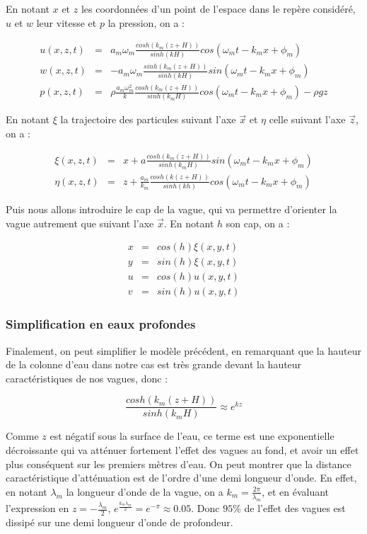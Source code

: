 				En notant $x$ et $z$ les coordonnées d'un point de l'espace dans le repère considéré, $u$ et $w$ leur vitesse et $p$ la pression, on a :

				\begin{eqnarray}
					u(x, z, t) & = & a_m \omega_m \frac{cosh(k_m(z+H))}{sinh(kH)} cos(\omega_m t -k_mx + \phi_m) \\
					w(x, z, t) & = & -a_m \omega_m \frac{sinh(k_m(z+H))}{sinh(kH)} sin(\omega_m t -k_mx + \phi_m) \\
					p(x, z, t) & = & \rho\frac{a_m\omega_m^2}{k} \frac{cosh(k_m(z+H))}{sinh(k_mH)} cos(\omega_m t -k_mx + \phi_m) - \rho g z
				\end{eqnarray}

				En notant $\xi$ la trajectoire des particules suivant l'axe $\overrightarrow{x}$ et $\eta$ celle suivant l'axe $\overrightarrow{z}$, on a :

				\begin{eqnarray}
					\xi(x, z, t) & = & x + a \frac{cosh(k_m(z+H))}{sinh(k_mH)} sin(\omega_m t -k_mx + \phi_m) \\
					\eta(x, z, t) & = & z + \frac{a_m}{k_m} \frac{cosh(k(z+H))}{sinh(kh)} cos(\omega_m t -k_mx + \phi_m)
				\end{eqnarray}

				Puis nous allons introduire le cap de la vague, qui va permettre d'orienter la vague autrement que suivant l'axe $\overrightarrow{x}$. En notant $h$ son cap, on a :

				\begin{eqnarray}
					x & = & cos(h) \xi(x, y, t) \\
					y & = & sin(h) \xi(x, y, t) \\
					u & = & cos(h) u(x, y, t) \\
					v & = & sin(h) u(x, y, t)
				\end{eqnarray}

			\subsubsection{Simplification en eaux profondes}
			
				Finalement, on peut simplifier le modèle précédent, en remarquant que la hauteur de la colonne d'eau dans notre cas est très grande devant la hauteur caractéristiques de nos vagues, donc :

				$$\frac{cosh(k_m(z+H))}{sinh(k_mH)} \approx e^{kz}$$

				Comme $z$ est négatif sous la surface de l'eau, ce terme est une exponentielle décroissante qui va atténuer fortement l'effet des vagues au fond, et avoir un effet plus conséquent sur les premiers mètres d'eau. On peut montrer que la distance caractéristique d'atténuation est de l'ordre d'une demi longueur d'onde. En effet, en notant $\lambda_m$ la longueur d'onde de la vague, on a $k_m = \tfrac{2\pi}{\lambda_m}$, et en évaluant l'expression en $z = - \tfrac{\lambda_m}{2}$, $e^{\tfrac{k_m\lambda_m}{2}} = e^{-\pi} \approx 0.05$. Donc $95 \%$ de l'effet des vagues est dissipé sur une demi longueur d'onde de profondeur.

